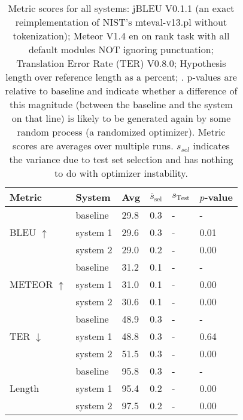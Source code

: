 \begin{table}[htb]
\begin{center}
\begin{footnotesize}
\begin{tabular}{|l|l|l|l|l|l|}
\hline
\bf Metric & \bf System & \bf Avg & \bf $\overline{s}_{\text{sel}}$ & \bf $s_{\text{Test}}$ & \bf $p$-value \\
\hline
\multirow{3}{*}{BLEU $\uparrow$}
& baseline & 29.8 & 0.3 & - & - \\
& system 1 & 29.6 & 0.3 & - & 0.01 \\
& system 2 & 29.0 & 0.2 & - & 0.00 \\
\hline
\multirow{3}{*}{METEOR $\uparrow$}
& baseline & 31.2 & 0.1 & - & - \\
& system 1 & 31.0 & 0.1 & - & 0.00 \\
& system 2 & 30.6 & 0.1 & - & 0.00 \\
\hline
\multirow{3}{*}{TER $\downarrow$}
& baseline & 48.9 & 0.3 & - & - \\
& system 1 & 48.8 & 0.3 & - & 0.64 \\
& system 2 & 51.5 & 0.3 & - & 0.00 \\
\hline
\multirow{3}{*}{Length }
& baseline & 95.8 & 0.3 & - & - \\
& system 1 & 95.4 & 0.2 & - & 0.00 \\
& system 2 & 97.5 & 0.2 & - & 0.00 \\
\hline
\end{tabular}
\end{footnotesize}
\end{center}
\caption{\label{tab:scores} Metric scores for all systems: jBLEU V0.1.1 (an exact reimplementation of NIST's mteval-v13.pl without tokenization); Meteor V1.4 en on rank task with all default modules NOT ignoring punctuation; Translation Error Rate (TER) V0.8.0; Hypothesis length over reference length as a percent; . p-values are relative to baseline and indicate whether a difference of this magnitude (between the baseline and the system on that line) is likely to be generated again by some random process (a randomized optimizer). Metric scores are averages over multiple runs. $s_{sel}$ indicates the variance due to test set selection and has nothing to do with optimizer instability.}
\end{table}
